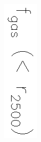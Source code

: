 \documentclass{aa}
\begin{document}
 
\begin{figure}[ht!]
\centering
\includegraphics[angle=90,width=9.cm]{Fgas_grupos+Maughan_r2500MtotEH.ps}

\end{figure}
\end{document}
